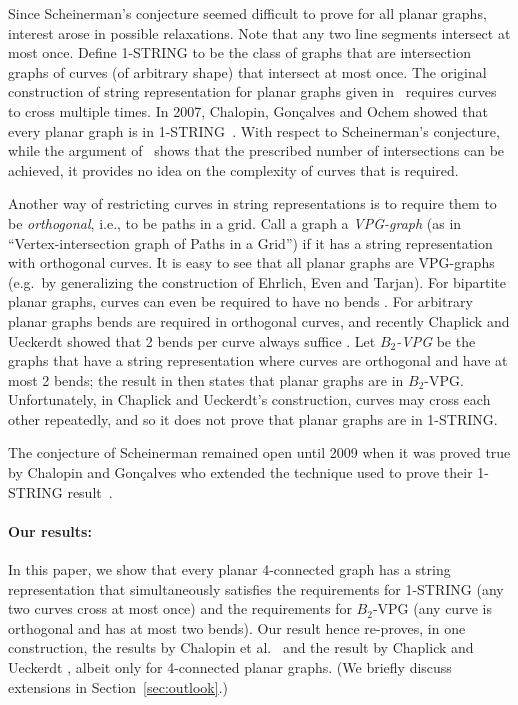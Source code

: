 \documentclass{article}
\begin{document}
Since Scheinerman's conjecture seemed difficult to prove for all planar
graphs, interest arose in possible relaxations.
Note that any two line segments intersect at most once.
Define 1-STRING to be the class of graphs that are intersection graphs
of curves (of arbitrary shape) that intersect at most once.
The original construction of string representation for planar graphs 
given in~\cite{cit:tarjan} requires curves to cross multiple times. 
In 2007, Chalopin, Gon\c{c}alves and Ochem showed that every
planar graph is in 1-STRING~\cite{cit:chalopin-gonclaves-ochem, cit:chalopin-string}.  With respect to Scheinerman's
conjecture, while the argument of~\cite{cit:chalopin-gonclaves-ochem, cit:chalopin-string} shows that the prescribed number
of intersections can be achieved, it provides no idea on the complexity of curves that is required.   

Another way of restricting curves in string representations is to require them
to be \emph{orthogonal}, i.e., to be paths in a grid.  Call a graph a
{\em VPG-graph} (as in ``Vertex-intersection graph of Paths in a Grid'')
if it has a string representation with orthogonal curves.
It is easy to see that all planar graphs are VPG-graphs (e.g.~by generalizing
the construction of Ehrlich, Even and Tarjan).  For bipartite planar graphs,
curves can even be required to have no bends \cite{cit:arroyo, cit:pach}.
For arbitrary planar graphs bends are required in orthogonal curves, and
recently Chaplick and Ueckerdt showed that 2 bends per curve always suffice
\cite{cit:chaplick}.  Let {\em $B_2$-VPG} be the graphs that have
a string representation where curves are
orthogonal and have at most 2 bends; the result in
\cite{cit:chaplick} then states that planar graphs are in $B_2$-VPG.
Unfortunately, in Chaplick and Ueckerdt's construction, curves may cross 
each other repeatedly, and so it
does not prove that planar graphs are in 1-STRING.

The conjecture of Scheinerman remained open until 2009 when it was proved true by Chalopin and Gon\c{c}alves \cite{cit:chalopin-gonclaves-ochem}
who extended the technique used to prove their 1-STRING 
result~\cite{cit:chalopin-seg}. 

\paragraph*{Our results:} 
In this paper, we show that every planar 4-connected graph has a 
string representation that simultaneously satisfies the requirements for
1-STRING (any two curves cross at most once) and the requirements
for $B_2$-VPG (any curve is orthogonal and has at most two bends).
Our result hence re-proves, in one construction, the results
by Chalopin et al.~\cite{cit:chalopin-seg} and the result by
Chaplick and Ueckerdt \cite{cit:chaplick}, albeit only for 4-connected 
planar graphs. (We briefly discuss extensions in Section~\ref{sec:outlook}.)
\end{document}
